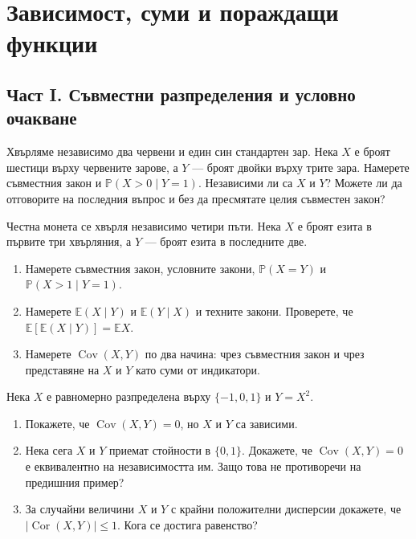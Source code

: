 \documentclass[11pt,a4paper]{article}
\newenvironment{enumeratea}{\begin{enumerate}[label=(\alph*),itemsep=0.28em,topsep=0.25em]}{\end{enumerate}}
\newcommand{\Pbb}{\mathbb P}
\newcommand{\Ebb}{\mathbb E}
\newcommand{\Cov}{\operatorname{Cov}}
\newcommand{\Cor}{\operatorname{Cor}}
\newcounter{problem}[section]
\begin{document}
\section{Зависимост, суми и пораждащи функции}

\subsection*{Част I. Съвместни разпределения и условно очакване}

\begin{problembook}
Хвърляме независимо два червени и един син стандартен зар. Нека $X$ е броят
шестици върху червените зарове, а $Y$ --- броят двойки върху трите зара.
Намерете съвместния закон и $\Pbb(X>0\mid Y=1)$. Независими ли са $X$ и $Y$?
Можете ли да отговорите на последния въпрос и без да пресмятате целия
съвместен закон?
\end{problembook}

\begin{problembook}
Честна монета се хвърля независимо четири пъти. Нека $X$ е броят езита в
първите три хвърляния, а $Y$ --- броят езита в последните две.
\begin{enumeratea}
  \item Намерете съвместния закон, условните закони, $\Pbb(X=Y)$ и
  $\Pbb(X>1\mid Y=1)$.
  \item Намерете $\Ebb(X\mid Y)$ и $\Ebb(Y\mid X)$ и техните закони.
  Проверете, че $\Ebb[\Ebb(X\mid Y)]=\Ebb X$.
  \item Намерете $\Cov(X,Y)$ по два начина: чрез съвместния закон и чрез
  представяне на $X$ и $Y$ като суми от индикатори.
\end{enumeratea}
\end{problembook}

\begin{problembook}
Нека $X$ е равномерно разпределена върху $\{-1,0,1\}$ и $Y=X^2$.
\begin{enumeratea}
  \item Покажете, че $\Cov(X,Y)=0$, но $X$ и $Y$ са зависими.
  \item Нека сега $X$ и $Y$ приемат стойности в $\{0,1\}$.
  Докажете, че $\Cov(X,Y)=0$ е еквивалентно на независимостта им.
  Защо това не противоречи на предишния пример?
  \item За случайни величини $X$ и $Y$ с крайни положителни дисперсии
  докажете, че $|\Cor(X,Y)|\le1$. Кога се достига равенство?
\end{enumeratea}
\end{problembook}
\end{document}
